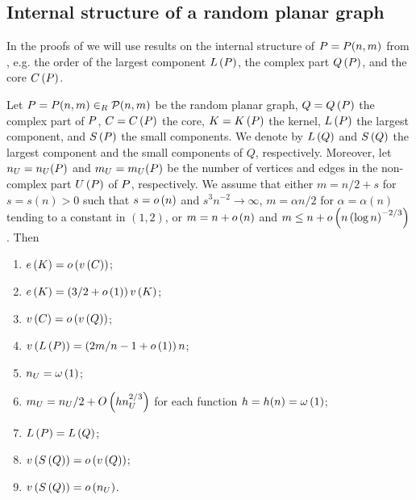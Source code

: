 \subsection{Internal structure of a random planar graph}
In the proofs of  we will use results on the internal structure of $P=P(n,m)$ from \cite{KangMosshammerSpruessel2020}, e.g. the order of the largest component $L\left(P\right)$, the complex part $Q\left(P\right)$, and the core $C\left(P\right)$.
\begin{thm}\label{LSthm:internal_structure}
	Let $P=P(n,m)\in_R\mathcal{P}(n,m)$ be the random planar graph, $Q=Q\left(P\right)$ the complex part of $P$, $C=C\left(P\right)$ the core, $K=K\left(P\right)$ the kernel, $L\left(P\right)$ the largest component, and $S\left(P\right)$ the small components. We denote by $L\left(Q\right)$ and $S\left(Q\right)$ the largest component and the small components of $Q$, respectively. Moreover, let $n_U=n_U(P)$ and $m_U=m_U(P)$ be the number of vertices and edges in the non-complex part $U\left(P\right)$ of $P$, respectively. We assume that either $m=n/2+s$ for $s=s(n)>0$ such that $s=o\left(n\right)$ and $s^3n^{-2}\to \infty$, $m=\alpha n/2$ for $\alpha=\alpha(n)$ tending to a constant in $(1,2)$, or $m=n+o\left(n\right)$ and $m\leq n+o\left(n\left(\log n\right)^{-2/3}\right)$. Then \whp
	\begin{enumerate}[label=\normalfont(\roman*)]
		\item\label{LSthm:internal_structure1}
		$e\left({K}\right)=o\left(v\left({C}\right)\right)$;
		\item\label{LSthm:internal_structure9}
		$e\left({K}\right)=\left(3/2+o\left(1\right)\right)v\left({K}\right)$;
		\item\label{LSthm:internal_structure2}
		$v\left({C}\right)=o\left(v\left({Q}\right)\right)$;
		\item\label{LSthm:internal_structure3}
		$v\left({L\left(P\right)}\right)=\left(2m/n-1+o\left(1\right)\right)n$;
		\item\label{LSthm:internal_structure4}
		$n_U=\omega\left(1\right)$;
		\item\label{LSthm:internal_structure5}
		$m_U= n_U/2+O\left(hn_U^{2/3}\right)$ for each function $h=h(n)=\omega\left(1\right)$;
		\item\label{LSthm:internal_structure6}
		$L\left(P\right)=L\left(Q\right)$;
		\item\label{LSthm:internal_structure7}
		$v\left({S\left(Q\right)}\right)=o\left(v\left({Q}\right)\right)$;
		\item\label{LSthm:internal_structure8}
		$v\left({S\left(Q\right)}\right)=o\left(n_U\right)$.
	\end{enumerate}
\end{thm}
